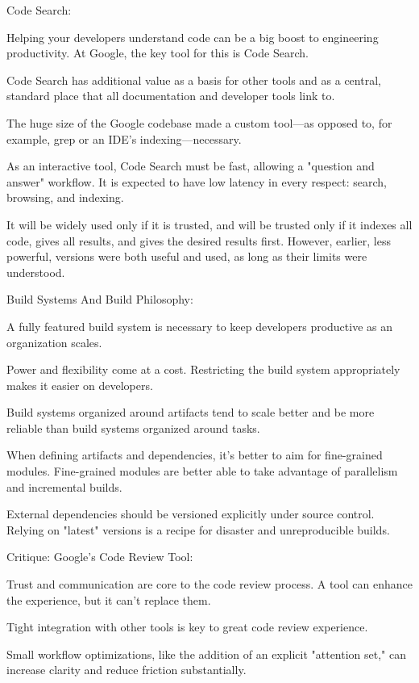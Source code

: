 Code Search:
\bit
\item Helping your developers understand code can be a big boost to engineering productivity. At Google, the key tool
for this is Code Search.
\item Code Search has additional value as a basis for other tools and as a central, standard place that all
documentation and developer tools link to.
\item The huge size of the Google codebase made a custom tool—as opposed to, for example, grep or an IDE's
indexing—necessary.
\item As an interactive tool, Code Search must be fast, allowing a "question and answer" workflow. It is expected to
have low latency in every respect: search, browsing, and indexing.
\item It will be widely used only if it is trusted, and will be trusted only if it indexes all code, gives all results,
and gives the desired results first. However, earlier, less powerful, versions were both useful and used, as long as
their limits were understood.
\eit

Build Systems And Build Philosophy:
\bit
\item A fully featured build system is necessary to keep developers productive as an organization scales.
\item Power and flexibility come at a cost. Restricting the build system appropriately makes it easier on developers.
\item Build systems organized around artifacts tend to scale better and be more reliable than build systems organized
around tasks.
\item When defining artifacts and dependencies, it's better to aim for fine-grained modules. Fine-grained modules are
better able to take advantage of parallelism and incremental builds.
\item External dependencies should be versioned explicitly under source control. Relying on "latest" versions is a
recipe for disaster and unreproducible builds.
\eit

Critique: Google's Code Review Tool:
\bit
\item Trust and communication are core to the code review process. A tool can enhance the experience, but it can't
replace them.
\item Tight integration with other tools is key to great code review experience.
\item Small workflow optimizations, like the addition of an explicit "attention set," can increase clarity and reduce
friction substantially.
\eit

